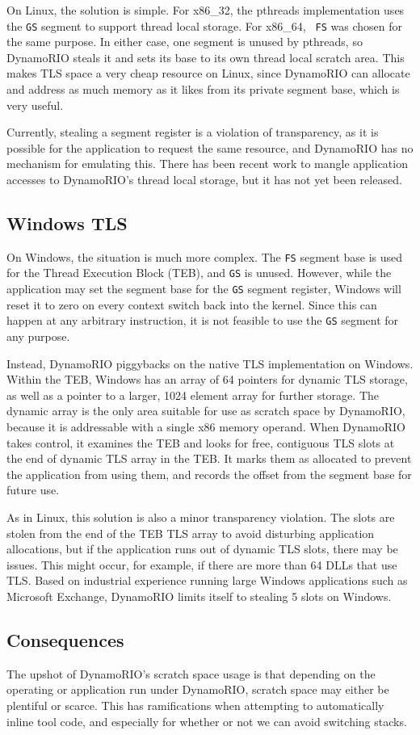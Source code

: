 On Linux, the solution is simple.  For x86\_32, the pthreads implementation
uses the {\tt GS} segment to support thread local storage.  For x86\_64, {\tt
FS} was chosen for the same purpose.  In either case, one segment is unused by
pthreads, so DynamoRIO steals it and sets its base to its own thread local
scratch area.  This makes TLS space a very cheap resource on Linux, since
DynamoRIO can allocate and address as much memory as it likes from its private
segment base, which is very useful.

Currently, stealing a segment register is a violation of transparency, as it is
possible for the application to request the same resource, and DynamoRIO has no
mechanism for emulating this.  There has been recent work to mangle application
accesses to DynamoRIO's thread local storage, but it has not yet been released.

\subsection{Windows TLS}

On Windows, the situation is much more complex.  The {\tt FS} segment base is
used for the Thread Execution Block (TEB)\cite{TODO}, and {\tt GS} is unused.
However, while the application may set the segment base for the {\tt GS}
segment register, Windows will reset it to zero on every context switch back
into the kernel.  Since this can happen at any arbitrary instruction, it is not
feasible to use the {\tt GS} segment for any purpose.

Instead, DynamoRIO piggybacks on the native TLS implementation on Windows.
Within the TEB, Windows has an array of 64 pointers for dynamic TLS storage, as
well as a pointer to a larger, 1024 element array for further storage.  The
dynamic array is the only area suitable for use as scratch space by DynamoRIO,
because it is addressable with a single x86 memory operand.  When DynamoRIO
takes control, it examines the TEB and looks for free, contiguous TLS slots at
the end of dynamic TLS array in the TEB.  It marks them as allocated to prevent
the application from using them, and records the offset from the segment base
for future use.

As in Linux, this solution is also a minor transparency violation.  The slots
are stolen from the end of the TEB TLS array to avoid disturbing application
allocations, but if the application runs out of dynamic TLS slots, there may be
issues.  This might occur, for example, if there are more than 64 DLLs that use
TLS.  Based on industrial experience running large Windows applications such as
Microsoft Exchange, DynamoRIO limits itself to stealing 5 slots on Windows.

\subsection{Consequences}

The upshot of DynamoRIO's scratch space usage is that depending on the
operating or application run under DynamoRIO, scratch space may either be
plentiful or scarce.  This has ramifications when attempting to automatically
inline tool code, and especially for whether or not we can avoid switching
stacks.
